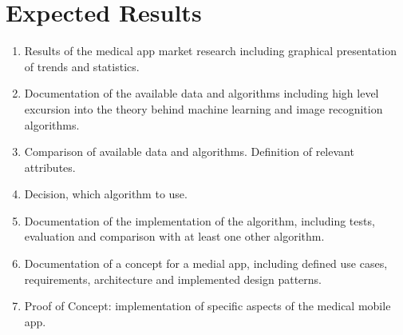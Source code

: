 \section{Expected Results}

\noindent
\begin{enumerate}
\item Results of the medical app market research including graphical presentation of trends and statistics.
\item Documentation of the available data and algorithms including high level excursion into the theory behind machine learning and image recognition algorithms.
\item Comparison of available data and algorithms. Definition of relevant attributes.
\item Decision, which algorithm to use.
\item Documentation of the implementation of the algorithm, including tests, evaluation and comparison with at least one other algorithm.
\item Documentation of a concept for a medial app, including defined use cases, requirements, architecture and implemented design patterns.
\item Proof of Concept: implementation of specific aspects of the medical mobile app.
\end{enumerate}